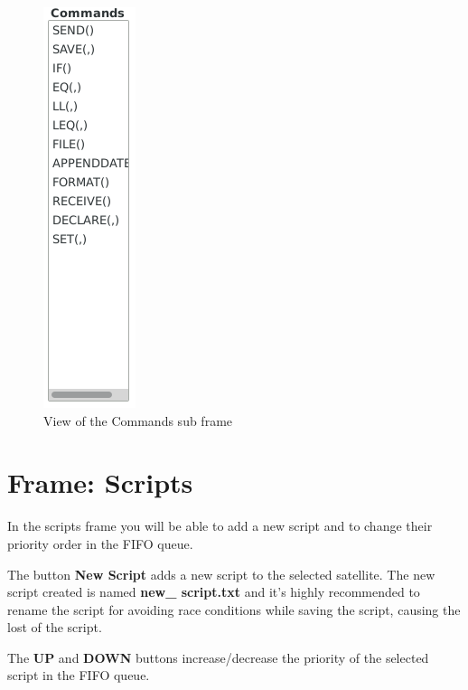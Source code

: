 \documentclass[pdftex,11pt,a4paper,titlepage]{report}
\begin{document}
\begin{figure}[h]
\centering
\includegraphics[scale=0.6]{../images/CommandsSubFrame.png}
\caption{View of the Commands sub frame}
\label{CommandsSubFrame}
\end{figure}
\chapter{Frame: Scripts}
\hspace{0.4cm} In the scripts frame you will be able to add a new script and to change their priority order in the FIFO queue. 

The button \textbf{New Script} adds a new script to the selected satellite. The new script created is named \textbf{new\_ script.txt} and it's highly recommended to rename the script for avoiding race conditions while saving the script, causing the lost of the script. 

The \textbf{UP} and \textbf{DOWN} buttons increase/decrease the priority of the selected script in the FIFO queue. 
\end{document}
